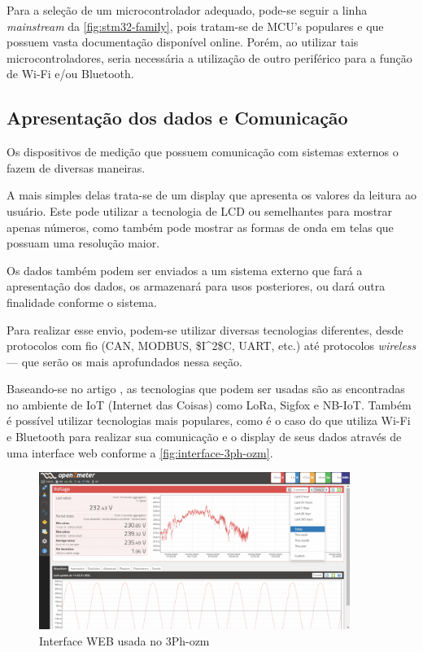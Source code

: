 Para a seleção de um microcontrolador adequado, pode-se seguir a linha \textit{mainstream} da \autoref{fig:stm32-family}, pois tratam-se de \gls{MCU}'s populares e que possuem vasta documentação disponível online. Porém, ao utilizar tais microcontroladores, seria necessária a utilização de outro periférico para a função de Wi-Fi e/ou Bluetooth.

\subsection{Apresentação dos dados e Comunicação}\label{sec:Interface}

Os dispositivos de medição que possuem comunicação com sistemas externos o fazem de diversas maneiras.

A mais simples delas trata-se de um display que apresenta os valores da leitura ao usuário. Este pode utilizar a tecnologia de \gls{LCD} ou semelhantes para mostrar apenas números, como também pode mostrar as formas de onda em telas que possuam uma resolução maior.

Os dados também podem ser enviados a um sistema externo que fará a apresentação dos dados, os armazenará para usos posteriores, ou dará outra finalidade conforme o sistema.

Para realizar esse envio, podem-se utilizar diversas tecnologias diferentes, desde protocolos com fio (CAN, MODBUS, \gls{$I^2$C}, UART, etc.) até protocolos \textit{wireless} --- que serão os mais aprofundados nessa seção.

Baseando-se no artigo \citet{lowcost-smartmeter}, as tecnologias que podem ser usadas são as encontradas no ambiente de IoT (Internet das Coisas) como LoRa, Sigfox e NB-IoT. Também é possível utilizar tecnologias mais populares, como é o caso do \citet{3ph-ozm} que utiliza Wi-Fi e Bluetooth para realizar sua comunicação e o display de seus dados através de uma interface web conforme a \autoref{fig:interface-3ph-ozm}.

\begin{figure}[htb!]
    \caption{Interface WEB usada no 3Ph-ozm}
    \label{fig:interface-3ph-ozm}
    \includegraphics[width=0.9\textwidth]{figuras/interface-web-openzmeter.png}
\end{figure}

